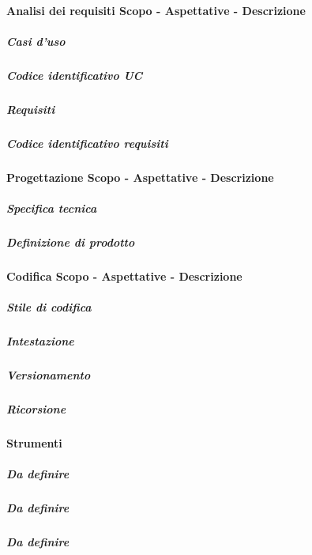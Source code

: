 \paragraph{Analisi dei requisiti Scopo - Aspettative - Descrizione}
\subparagraph{Casi d'uso}
\subparagraph{Codice identificativo UC}
\subparagraph{Requisiti}
\subparagraph{Codice identificativo requisiti}
\paragraph{Progettazione Scopo - Aspettative - Descrizione}
\subparagraph{Specifica tecnica}
\subparagraph{Definizione di prodotto}
\paragraph{Codifica Scopo - Aspettative - Descrizione}
\subparagraph{Stile di codifica}
\subparagraph{Intestazione}
\subparagraph{Versionamento}
\subparagraph{Ricorsione}
\paragraph{Strumenti}
\subparagraph{Da definire}
\subparagraph{Da definire}
\subparagraph{Da definire}



